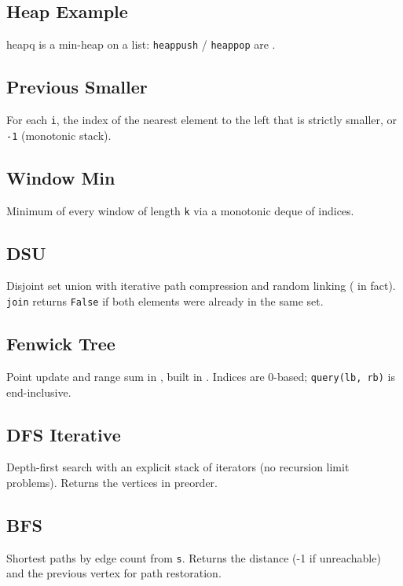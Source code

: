 \subsection{Heap Example}
heapq is a min-heap on a list: \verb|heappush| / \verb|heappop| are .

\subsection{Previous Smaller}
For each \verb|i|, the index of the nearest element to the left that is strictly smaller, or \verb|-1| (monotonic stack). 

\subsection{Window Min}
Minimum of every window of length \verb|k| via a monotonic deque of indices.

\subsection{DSU}
Disjoint set union with iterative path compression and random linking ( in fact). \verb|join| returns \verb|False| if both elements were already in the same set.

\subsection{Fenwick Tree}
Point update and range sum in , built in . Indices are 0-based; \verb|query(lb, rb)| is end-inclusive.

\subsection{DFS Iterative}
Depth-first search with an explicit stack of iterators (no recursion limit problems). Returns the vertices in preorder.

\subsection{BFS}
Shortest paths by edge count from \verb|s|. Returns the distance (-1 if unreachable) and the previous vertex for path restoration.

